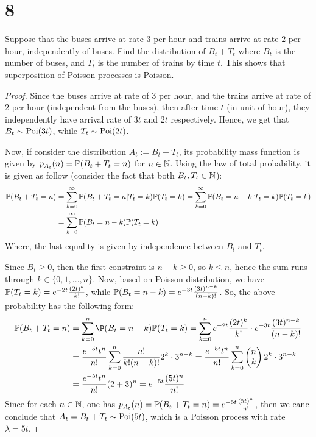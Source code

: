 \documentclass{article}
\begin{document}
\newpage

\section*{8}
\begin{ques}\label{q7}
    Suppose that the buses arrive at rate $3$ per hour and trains arrive at rate $2$ per hour, independently of buses. Find the distribution of $B_t+T_t$ where $B_t$ is the number of buses, and $T_t$ is the number of trains by time $t$. This shows that superposition of Poisson processes is Poisson.
\end{ques}

\begin{proof}
    Since the buses arrive at rate of $3$ per hour, and the trains arrive at rate of $2$ per hour (independent from the buses), then after time $t$ (in unit of hour), they independently have arrival rate of $3t$ and $2t$ respectively. Hence, we get that $B_t \sim \mathrm{Poi}(3t)$, while $T_t\sim\mathrm{Poi}(2t)$.

    Now, if consider the distribution $A_t:=B_t+T_t$, its probability mass function is given by $p_{A_t}(n) = \mathbb{P}(B_t+T_t= n)$ for $n\in\mathbb{N}$. Using the law of total probability, it is given as follow (consider the fact that both $B_t,T_t\in\mathbb{N}$):
    \begin{align}
        \mathbb{P}(B_t+T_t= n)&= \sum_{k=0}^{\infty}\mathbb{P}(B_t+T_t= n|T_t=k)\mathbb{P}(T_t=k) = \sum_{k=0}^\infty\mathbb{P}(B_t= n-k|T_t=k)\mathbb{P}(T_t=k)\\
        &= \sum_{k=0}^{\infty}\mathbb{P}(B_t= n-k)\mathbb{P}(T_t=k)
    \end{align}
    Where, the last equality is given by independence between $B_t$ and $T_t$.

    Since $B_t\geq 0$, then the first constraint is $n-k\geq 0$, so $k\leq n$, hence the sum runs through $k\in\{0,1,...,n\}$. Now, based on Poisson distribution, we have $\mathbb{P}(T_t=k) = e^{-2t}\frac{(2t)^k}{k!}$, while $\mathbb{P}(B_t=n-k) = e^{-3t}\frac{(3t)^{n-k}}{(n-k)!}$. So, the above probability has the following form:
    \begin{align}
        \PP(B_t+T_t=n)&=\sum_{k=0}^{n}\P(B_t= n-k)\PP(T_t=k) = \sum_{k=0}^{n}e^{-2t}\frac{(2t)^k}{k!}\cdot e^{-3t}\frac{(3t)^{n-k}}{(n-k)!}\\
        &= \frac{e^{-5t}t^n}{n!}\sum_{k=0}^{n}\frac{n!}{k!(n-k)!}2^k \cdot 3^{n-k} = \frac{e^{-5t}t^n}{n!}\sum_{k=0}^{n}\begin{pmatrix}
            n\\k
        \end{pmatrix}2^k\cdot 3^{n-k}\\
        &= \frac{e^{-5t}t^n}{n!}(2+3)^n = e^{-5t}\frac{(5t)^n}{n!}
    \end{align}
    Since for each $n\in\mathbb{N}$, one has $p_{A_t}(n) = \mathbb{P}(B_t+T_t=n)=e^{-5t}\frac{(5t)^n}{n!}$, then we canc conclude that $A_t=B_t+T_t\sim \mathrm{Poi}(5t)$, which is a Poisson process with rate $\lambda = 5t$.
\end{proof}
\end{document}
